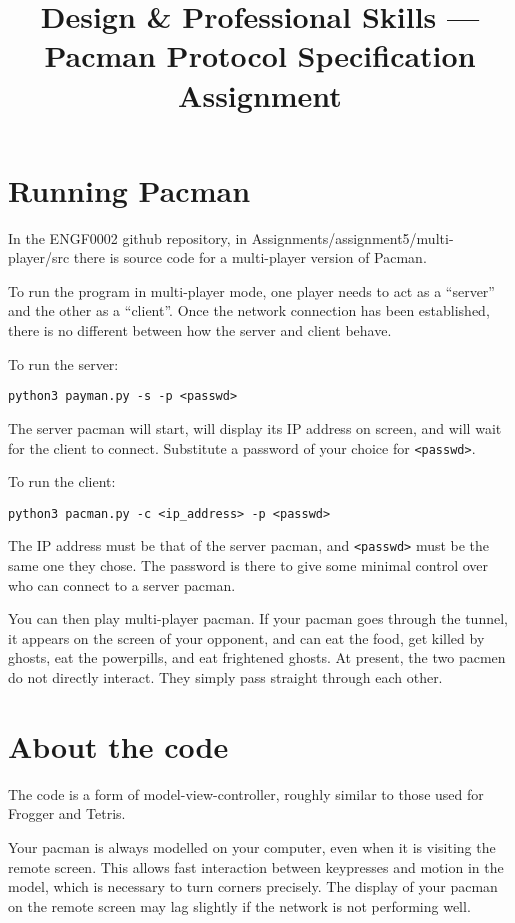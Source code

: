 \documentclass{article}
\title{Design \& Professional Skills --- Pacman Protocol Specification Assignment}
\author{}
\date{}
\begin{document}
\maketitle

\section{Running Pacman}

In the ENGF0002 github repository, in Assignments/assignment5/multi-player/src there is source code for a multi-player version of Pacman.

To run the program in multi-player mode, one player needs to act as a
``server'' and the other as a ``client''.  Once the network connection
has been established, there is no different between how the server and
client behave.

To run the server:

\begin{verbatim}
python3 payman.py -s -p <passwd>
\end{verbatim}

The server pacman will start, will display its IP address on screen,
and will wait for the client to connect.  Substitute a password of your choice for {\tt <passwd>}.

To run the client:

\begin{verbatim}
python3 pacman.py -c <ip_address> -p <passwd>
\end{verbatim}

The IP address must be that of the server pacman, and {\tt <passwd>} must be
the same one they chose.  The password is there to give some minimal
control over who can connect to a server pacman.

You can then play multi-player pacman.  If your pacman goes through
the tunnel, it appears on the screen of your opponent, and can eat the
food, get killed by ghosts, eat the powerpills, and eat frightened
ghosts.  At present, the two pacmen do not directly interact.  They
simply pass straight through each other.

\newpage
\section{About the code}

The code is a form of model-view-controller, roughly similar to those
used for Frogger and Tetris.

Your pacman is always modelled on your computer, even when it is
visiting the remote screen.  This allows fast interaction between
keypresses and motion in the model, which is necessary to turn corners
precisely.  The display of your pacman on the remote screen may lag
slightly if the network is not performing well.
\end{document}
